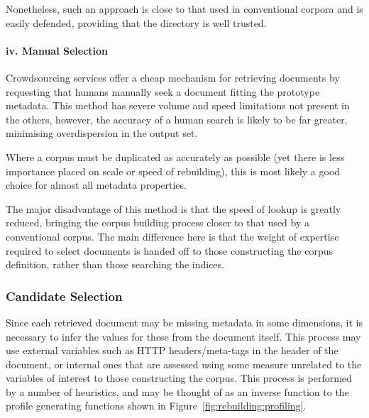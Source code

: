 Nonetheless, such an approach is close to that used in conventional corpora and is easily defended, providing that the directory is well trusted.%

\paragraph{iv. Manual Selection}
Crowdsourcing services offer a cheap mechanism for retrieving documents by requesting that humans manually seek a document fitting the prototype metadata.  This method has severe volume and speed limitations not present in the others, however, the accuracy of a human search is likely to be far greater, minimising overdispersion in the output set.

Where a corpus must be duplicated as accurately as possible (yet there is less importance placed on scale or speed of rebuilding), this is most likely a good choice for almost all metadata properties.

The major disadvantage of this method is that the speed of lookup is greatly reduced, bringing the corpus building process closer to that used by a conventional corpus.  The main difference here is that the weight of expertise required to select documents is handed off to those constructing the corpus definition, rather than those searching the indices.







\subsubsection{Candidate Selection}

Since each retrieved document may be missing metadata in some dimensions, it is necessary to infer the values for these from the document itself.  This process may use external variables such as HTTP headers/meta-tags in the header of the document, or internal ones that are assessed using some measure unrelated to the variables of interest to those constructing the corpus.  This process is performed by a number of heuristics, and may be thought of as an inverse function to the profile generating functions shown in Figure~\ref{fig:rebuilding:profiling}.

